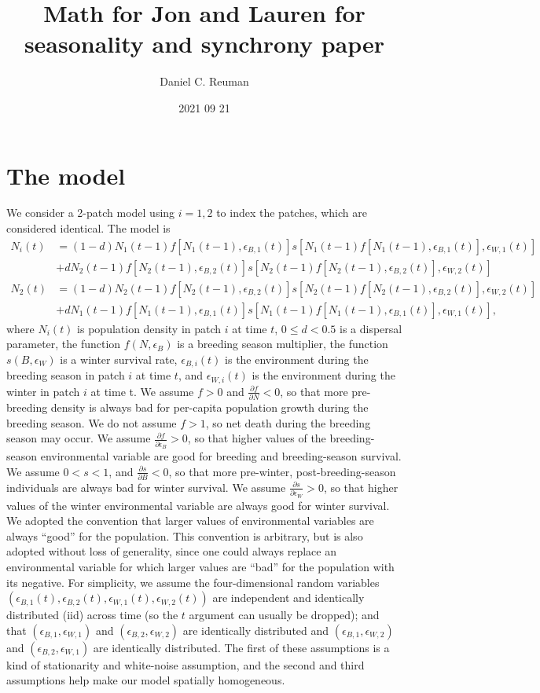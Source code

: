 \documentclass[letterpaper,11pt]{article}
\title{Math for Jon and Lauren for seasonality and synchrony paper}
\date{2021 09 21}
\author[a]{Daniel C. Reuman}
\affil[a]{Department of Ecology and Evolutionary Biology and Center for Ecological Research and Kansas Biological Survey, University of Kansas}
\begin{document}
\maketitle

\section{The model}\label{sect:model}

We consider a 2-patch model using $i=1,2$ to index the patches, which are considered identical. The model is
\begin{align}
N_i(t) &= (1-d)N_1(t-1)f[N_1(t-1),\epsilon_{B,1}(t)]s[N_1(t-1)f[N_1(t-1),\epsilon_{B,1}(t)],\epsilon_{W,1}(t)] \label{eq:genmod_1}\\
&+ dN_2(t-1)f[N_2(t-1),\epsilon_{B,2}(t)]s[N_2(t-1)f[N_2(t-1),\epsilon_{B,2}(t)],\epsilon_{W,2}(t)] \\
N_2(t) &= (1-d)N_2(t-1)f[N_2(t-1),\epsilon_{B,2}(t)]s[N_2(t-1)f[N_2(t-1),\epsilon_{B,2}(t)],\epsilon_{W,2}(t)] \\
&+ dN_1(t-1)f[N_1(t-1),\epsilon_{B,1}(t)]s[N_1(t-1)f[N_1(t-1),\epsilon_{B,1}(t)],\epsilon_{W,1}(t)],\label{eq:genmod_4}
\end{align}
where $N_i(t)$ is population density in patch $i$ at time $t$, $0 \leq d < 0.5$ is a
dispersal parameter, the function $f(N,\epsilon_B)$ is a breeding season multiplier,
the function $s(B,\epsilon_W)$ is a winter survival
rate, $\epsilon_{B,i}(t)$ is the environment during the breeding season in patch
$i$ at time $t$, and $\epsilon_{W,i}(t)$ is the environment during the winter in patch
$i$ at time t. We assume $f>0$ and
$\frac{\partial f}{\partial N}<0$, so that more pre-breeding density is always bad
for per-capita population growth during the breeding season. We do not assume $f>1$, so
net death during the breeding season may occur. We assume $\frac{\partial f}{\partial \epsilon_B}>0$, so that higher values of the breeding-season
environmental variable are good for
breeding and breeding-season survival. We assume $0 < s < 1$, and
$\frac{\partial s}{\partial B}<0$, so that more pre-winter, post-breeding-season
individuals are always bad for winter survival. We assume
$\frac{\partial s}{\partial \epsilon_W}>0$, so that higher values of the winter
environmental variable are always good for winter survival. We adopted the
convention that larger values of environmental variables are always ``good'' for
the population. This convention is arbitrary, but is also
adopted without loss of generality, since one
could always replace an environmental variable for which larger values are
``bad'' for the population with its negative. 
For simplicity, we assume the four-dimensional random variables $(\epsilon_{B,1}(t),\epsilon_{B,2}(t),\epsilon_{W,1}(t),\epsilon_{W,2}(t))$
are independent and identically distributed (iid) across time (so the 
$t$ argument can usually be dropped); and
that $(\epsilon_{B,1},\epsilon_{W,1})$ and 
$(\epsilon_{B,2},\epsilon_{W,2})$ are identically distributed and
$(\epsilon_{B,1},\epsilon_{W,2})$ and $(\epsilon_{B,2},\epsilon_{W,1})$
are identically distributed.
The first of these assumptions is a kind of stationarity and white-noise 
assumption, and the second and third assumptions help make our model
spatially homogeneous.
\end{document}
